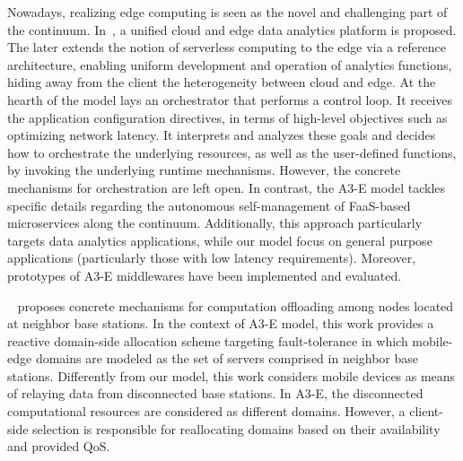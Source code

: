 Nowadays, realizing edge computing is seen as the novel and challenging part of the continuum. In~\cite{Nastic17ServerlessDataAnalytics}, a unified cloud and edge data analytics platform is proposed. The later extends the notion of serverless computing to the edge via a reference architecture, enabling uniform development and operation of analytics functions, hiding away from the client the heterogeneity between cloud and edge. At the hearth of the model lays an orchestrator that performs a control loop. It receives
the application configuration directives, in terms of high-level objectives
such as optimizing network latency. It interprets and analyzes these goals
and decides how to orchestrate the
underlying resources, as well as the
user-defined functions, by invoking
the underlying runtime mechanisms. However, the concrete mechanisms for orchestration are left open. In contrast, the A3-E model tackles specific details regarding the autonomous self-management of FaaS-based microservices along the continuum. Additionally, this approach particularly targets data analytics applications, while our model focus on general purpose applications (particularly those with low latency requirements). Moreover, prototypes of A3-E middlewares have been implemented and evaluated. 



~\cite{Satria2017mec} proposes concrete mechanisms for computation offloading among nodes located at neighbor base stations. In the context of A3-E model, this work provides a reactive domain-side allocation scheme targeting fault-tolerance in which mobile-edge domains are modeled as the set of servers comprised in neighbor base stations. Differently from our model, this work considers mobile devices as means of relaying data from disconnected base stations. In A3-E, the disconnected computational resources are considered as different domains. However, a client-side selection is responsible for reallocating domains based on their availability and provided QoS. 

